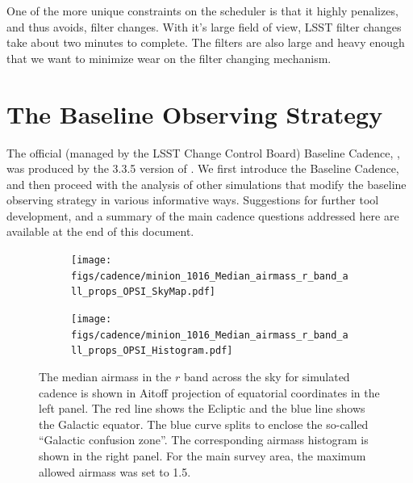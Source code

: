 One of the more unique constraints on the \OpSim scheduler is that it highly penalizes, and thus avoids, filter changes.  With it's large field of view, LSST filter changes take about two minutes to complete. The filters are also large and heavy enough that we want to minimize wear on the filter changing mechanism.

\section{The Baseline Observing Strategy}
\def\secname{cadexp:baseline}\label{sec:\secname}

The official (managed by the LSST Change Control Board)
Baseline Cadence, , was produced by the 3.3.5 version of
\OpSim. We first introduce the Baseline Cadence,
and then proceed with the analysis of other simulations that modify the baseline
observing strategy in various informative ways. Suggestions for
further tool development, and a summary of the main cadence questions
addressed here are available at the end of this document.





\begin{figure}[tbh!]
\begin{subfigure}[b]{0.49\textwidth}
\texttt{[image: figs/cadence/minion\_1016\_Median\_airmass\_r\_band\_all\_props\_OPSI\_SkyMap.pdf]}
\end{subfigure}
\hfill
\begin{subfigure}[b]{0.49\textwidth}
\texttt{[image: figs/cadence/minion\_1016\_Median\_airmass\_r\_band\_all\_props\_OPSI\_Histogram.pdf]}
\end{subfigure}
\caption{The median airmass in the $r$ band across the sky for simulated cadence
 is shown in Aitoff projection of equatorial coordinates
in the left panel. The red line shows the Ecliptic and the blue line shows the Galactic
equator. The blue curve splits to enclose the so-called ``Galactic confusion zone''. The corresponding
airmass histogram is shown in the right panel. For the main survey area, the maximum
allowed airmass was set to 1.5. }
\label{fig:airmassenigma}
\end{figure}

